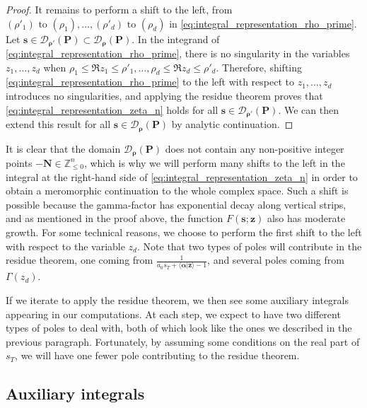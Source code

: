 \documentclass[a4paper,12pt]{article}
\theoremstyle{definition}
\numberwithin{equation}{section}
\begin{document}
\begin{proof}
It remains to perform a shift to the left, from $(\rho'_1) \text{ to } (\rho_1), \ldots, (\rho'_d) \text{ to } (\rho_d)$ in \eqref{eq:integral_representation_rho_prime}. Let $\mathbf{s} \in \mathcal{D}_{\boldsymbol{\rho}'}(\mathbf{P}) \subset \mathcal{D}_{\boldsymbol{\rho}}(\mathbf{P})$. In the integrand of \eqref{eq:integral_representation_rho_prime}, there is no singularity in the variables $z_1,\ldots,z_d$ when $\rho_1 \leq \Re z_1 \leq \rho'_1, \ldots, \rho_d \leq \Re z_d \leq \rho'_d$. Therefore, shifting \eqref{eq:integral_representation_rho_prime} to the left with respect to $z_1,\ldots,z_d$ introduces no singularities, and applying the residue theorem proves that \eqref{eq:integral_representation_zeta_n} holds for all $\mathbf{s} \in \mathcal{D}_{\boldsymbol{\rho}'}(\mathbf{P})$. We can then extend this result for all $\mathbf{s} \in \mathcal{D}_{\boldsymbol{\rho}}(\mathbf{P})$ by analytic continuation.
\end{proof}

It is clear that the domain $\mathcal{D}_{\boldsymbol{\rho}}(\mathbf{P})$ does not contain any non-positive integer points $-\mathbf{N} \in \mathbb{Z}_{\leq 0}^n$, which is why we will perform many shifts to the left in the integral at the right-hand side of \eqref{eq:integral_representation_zeta_n} in order to obtain a meromorphic continuation to the whole complex space. Such a shift is possible because the gamma-factor has exponential decay along vertical strips, and as mentioned in the proof above, the function $F(\mathbf{s};\mathbf{z})$ also has moderate growth. For some technical reasons, we choose to perform the first shift to the left with respect to the variable $z_d$. Note that two types of poles will contribute in the residue theorem, one coming from 
$\displaystyle{\frac{1}{a_0s_T+\langle \boldsymbol{\alpha}|\mathbf{z} \rangle-1}}$, and several poles coming from $\Gamma(z_d)$. 

If we iterate to apply the residue theorem, we then see some auxiliary integrals appearing in our computations. At each step, we expect to have two different types of poles to deal with, both of which look like the ones we described in the previous paragraph. Fortunately, by assuming some conditions on the real part of $s_T$, we will have one fewer pole contributing to the residue theorem.

\subsection{Auxiliary integrals}
\label{subsection:recursive_structure}
\end{document}
